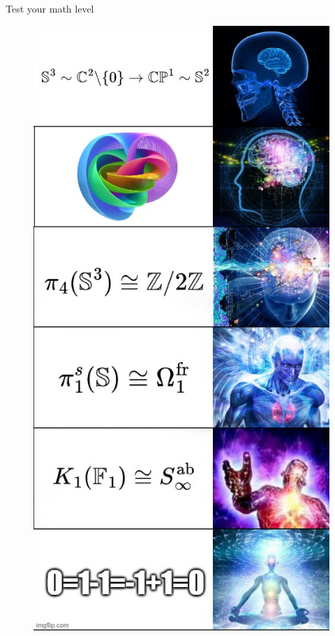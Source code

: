 \documentclass[12pt]{beamer}
\begin{document}
\begin{frame}{Test your math level}
  \pause
\begin{figure}
  \begin{center}
    \includegraphics[height=0.8\textheight]{figures/hopf_meme.jpg}
  \end{center}
\end{figure}

\end{frame}
\end{document}
